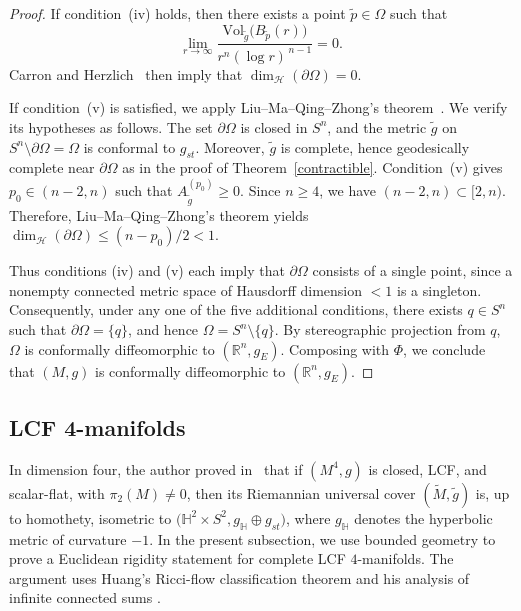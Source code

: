 \documentclass[12pt,oneside,a4paper]{article}
\theoremstyle{mytheorem}
\theoremstyle{remark}
\theoremstyle{definition}
\begin{document}
\begin{proof}
If condition~(iv) holds, then there exists a point $\widetilde p \in \Omega$ such that
\[
\lim_{r \to \infty} \frac{\mathrm{Vol}_{\widetilde g}\bigl(B_{\widetilde p}(r)\bigr)}{r^{n} (\log r)^{\,n-1}} = 0.
\]
Carron and Herzlich~\cite[Proposition~2.2]{zbMATH01756816} then imply that $\dim_{\mathcal{H}}(\partial \Omega)=0$.

If condition~(v) is satisfied, we apply Liu--Ma--Qing--Zhong's theorem~\cite[Theorem~5.1.1]{zbMATH08029235}. We verify its hypotheses as follows. The set $\partial\Omega$ is closed in $S^n$, and the metric $\widetilde g$ on $S^n \setminus \partial\Omega = \Omega$ is conformal to $g_{st}$. Moreover, $\widetilde g$ is complete, hence geodesically complete near $\partial\Omega$ as in the proof of Theorem~\ref{contractible}. Condition~(v) gives $p_0 \in (n-2,n)$ such that $A_{\widetilde g}^{(p_0)} \ge 0$. Since $n \ge 4$, we have $(n-2,n) \subset [2,n)$. Therefore, Liu--Ma--Qing--Zhong's theorem yields
$\dim_{\mathcal{H}}(\partial\Omega) \le (n-p_0)/2 < 1.$

Thus conditions (iv) and (v) each imply that $\partial\Omega$ consists of a single point,
since a nonempty connected metric space of Hausdorff dimension $<1$ is a singleton.
Consequently, under any one of the five additional conditions, there exists
\(q\in S^n\) such that \(\partial\Omega=\{q\}\), and hence
\(\Omega=S^n\setminus\{q\}\).
By stereographic projection from \(q\), \(\Omega\) is conformally diffeomorphic
to \((\mathbb R^n,g_E)\). Composing with \(\Phi\), we conclude that
\((M,g)\) is conformally diffeomorphic to \((\mathbb R^n,g_E)\).
\end{proof}

\subsection{LCF 4-manifolds}

In dimension four, the author proved in~\cite[Theorem~5.3]{2025arXiv251213528D} that
if \((M^4,g)\) is closed, LCF, and scalar-flat, with
\(\pi_2(M)\neq 0\), then its Riemannian universal cover
\((\widetilde M,\widetilde g)\) is, up to homothety, isometric to
\(\bigl(\mathbb H^2\times S^2,g_{\mathbb H}\oplus g_{st}\bigr)\), where
\(g_{\mathbb H}\) denotes the hyperbolic metric of curvature \(-1\). In the present subsection, we use
bounded geometry to prove a Euclidean rigidity statement for complete
LCF \(4\)-manifolds. The argument uses Huang's Ricci-flow classification
theorem and his analysis of infinite connected sums
\cite[Theorem~1.1 and \S\S~2--3]{zbMATH07110928}.
\end{document}
